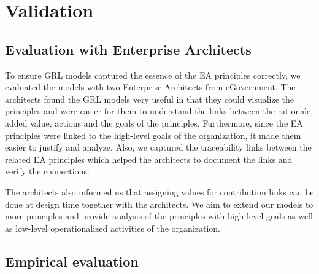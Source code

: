 \section{Validation}
\label{sect:validation}

\subsection{Evaluation with Enterprise Architects}


To ensure GRL models captured the essence of the EA principles correctly, we evaluated the models with two Enterprise Architects from eGovernment. The
architects found the GRL models very useful in that they could visualize the principles and were easier for them to understand the links between the rationale, added value, actions and the goals of the principles. Furthermore, since the EA
principles were linked to the high-level goals of the organization, it made them easier to justify and analyze. Also, we captured the traceability links between the related EA principles which helped the architects to document the links and
verify the connections.

The architects also informed us that assigning values for contribution links can be done at design time together with the architects.
We aim to extend our models to more principles and provide analysis of the principles with high-level goals as well as low-level operationalized activities of the organization.

\subsection{Empirical evaluation}


